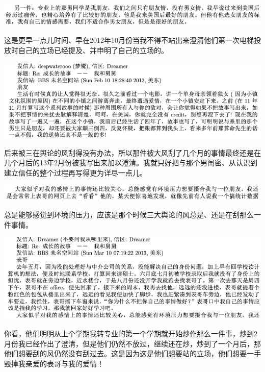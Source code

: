 \documentclass[9pt, b5paper]{article}
\begin{document}
\begin{center}
\includegraphics[width=.9\linewidth]{./pic/backups_plans_20210424_102654.png}
\end{center}

这是更早一点儿时间、早在2012年10月份当我不得不站出来澄清他们第一次电梯投放时自己的立场已经提及、并申明了自己的立场的。

\begin{center}
\includegraphics[width=.9\linewidth]{./pic/backups_plans_20210424_102814.png}
\end{center}

后来被三在舆论的风刮得没有办法，所以那件被大风刮了几个月的事情最终还是在几个月后的13年2月份被我写出来加以澄清。我就只好把与那个男闺密、从认识到建立信任的整个过程再写得更为详尽一点儿。

\begin{center}
\includegraphics[width=.9\linewidth]{./pic/backups_plans_20210424_113449.png}
\end{center}

总是能够感觉到环境的压力，应该是那个时候三大舆论的风总是、还是在刮那么一件事情。

\begin{center}
\includegraphics[width=.9\linewidth]{./pic/backups_plans_20210501_093920.png}
\end{center}

你看，他们明明从上个学期我转专业的第一个学期就开始炒作那么一件事，炒到2月份我已经作出了澄清，但是他们仍然不放过，继续还在炒，炒到了一个月后，那他们想要刮的风仍然没有刮过去。这是因为这是他们想要站的立场，他们想要一手毁掉我亲爱的表哥与我的爱情！
\end{document}
